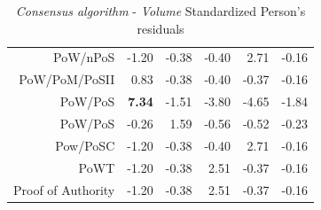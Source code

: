 \documentclass{bmcart}
\begin{document}
\begin{backmatter}
\begin{table}[ht]
\begin{tabular}{rrrrrr}
		PoW/nPoS & -1.20 & -0.38 & -0.40 & 2.71 & -0.16 \\ 
		PoW/PoM/PoSII & 0.83 & -0.38 & -0.40 & -0.37 & -0.16 \\ 
		PoW/PoS & \textbf{7.34} & -1.51 & -3.80 & -4.65 & -1.84 \\ 
		PoW/PoS  & -0.26 & 1.59 & -0.56 & -0.52 & -0.23 \\ 
		Pow/PoSC & -1.20 & -0.38 & -0.40 & 2.71 & -0.16 \\ 
		PoWT & -1.20 & -0.38 & 2.51 & -0.37 & -0.16 \\ 
		Proof of Authority & -1.20 & -0.38 & 2.51 & -0.37 & -0.16 \\ 
		\hline
	\end{tabular}
	\caption{\textit{Consensus algorithm} - \textit{Volume} Standardized Person's residuals}
	\label{tab:ConsensusPercVolume}
\end{table}


\end{backmatter}
\end{document}
